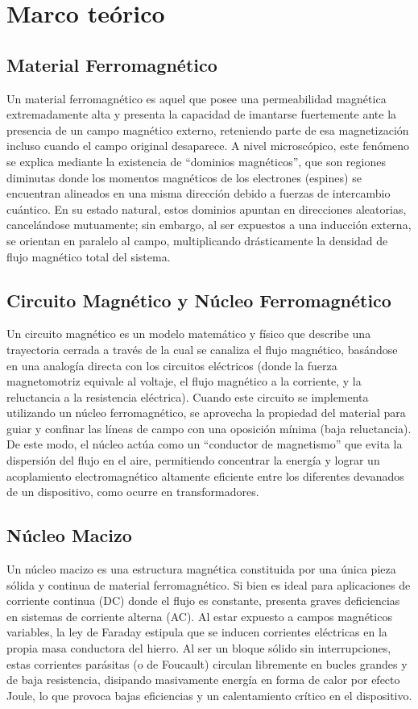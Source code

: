 \section{Marco teórico}


\subsection{Material Ferromagnético}
Un material ferromagnético es aquel que posee una permeabilidad magnética extremadamente alta y presenta la capacidad de imantarse fuertemente ante la presencia de un campo magnético externo, reteniendo parte de esa magnetización incluso cuando el campo original desaparece. A nivel microscópico, este fenómeno se explica mediante la existencia de ``dominios magnéticos'', que son regiones diminutas donde los momentos magnéticos de los electrones (espines) se encuentran alineados en una misma dirección debido a fuerzas de intercambio cuántico. En su estado natural, estos dominios apuntan en direcciones aleatorias, cancelándose mutuamente; sin embargo, al ser expuestos a una inducción externa, se orientan en paralelo al campo, multiplicando drásticamente la densidad de flujo magnético total del sistema. 

\subsection{Circuito Magnético y Núcleo Ferromagnético}
Un circuito magnético es un modelo matemático y físico que describe una trayectoria cerrada a través de la cual se canaliza el flujo magnético, basándose en una analogía directa con los circuitos eléctricos (donde la fuerza magnetomotriz equivale al voltaje, el flujo magnético a la corriente, y la reluctancia a la resistencia eléctrica). Cuando este circuito se implementa utilizando un núcleo ferromagnético, se aprovecha la propiedad del material para guiar y confinar las líneas de campo con una oposición mínima (baja reluctancia). De este modo, el núcleo actúa como un ``conductor de magnetismo'' que evita la dispersión del flujo en el aire, permitiendo concentrar la energía y lograr un acoplamiento electromagnético altamente eficiente entre los diferentes devanados de un dispositivo, como ocurre en transformadores.

\subsection{Núcleo Macizo}
Un núcleo macizo es una estructura magnética constituida por una única pieza sólida y continua de material ferromagnético. Si bien es ideal para aplicaciones de corriente continua (DC) donde el flujo es constante, presenta graves deficiencias en sistemas de corriente alterna (AC). Al estar expuesto a campos magnéticos variables, la ley de Faraday estipula que se inducen corrientes eléctricas en la propia masa conductora del hierro. Al ser un bloque sólido sin interrupciones, estas corrientes parásitas (o de Foucault) circulan libremente en bucles grandes y de baja resistencia, disipando masivamente energía en forma de calor por efecto Joule, lo que provoca bajas eficiencias y un calentamiento crítico en el dispositivo.

